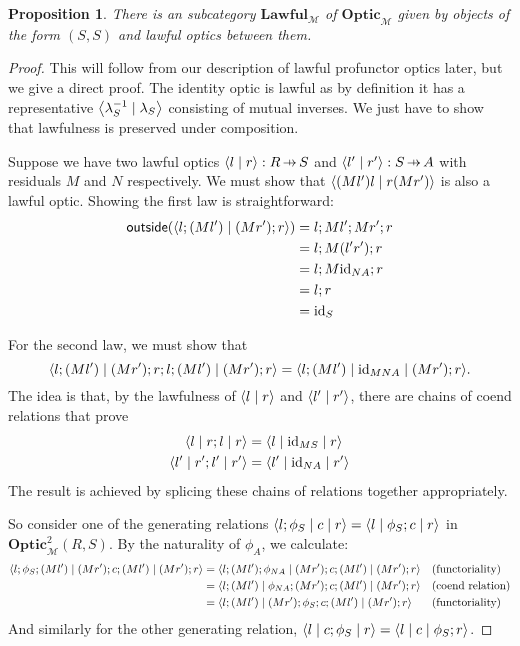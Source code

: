 \documentclass[11pt,letterpaper]{article}
\theoremstyle{plain}
\newtheorem{proposition}[theorem]{Proposition}
\theoremstyle{definition}
\newcommand{\M}{\mathscr{M}}
\newcommand{\Optic}{\mathbf{Optic}}
\newcommand{\Twoptic}{\mathbf{Optic}^2}
\newcommand{\Lawful}{\mathbf{Lawful}}
\newcommand{\id}{\mathrm{id}}
\newcommand{\rep}[2]{{\ensuremath \left\langle #1 \mid #2 \right\rangle}}
\newcommand{\repthree}[3]{{\ensuremath \langle #1 \mid #2 \mid #3 \rangle}}
\newcommand{\outside}{\mathsf{outside}}
\newcommand{\hto}{\ensuremath{\,\mathaccent\shortmid\rightarrow\,}}
\begin{document}
\begin{proposition}\label{prop:lawful-category}
  There is an subcategory $\Lawful_\M$ of $\Optic_\M$ given by objects of the form $(S, S)$ and lawful optics between them.
\end{proposition}
\begin{proof}
  This will follow from our description of lawful profunctor optics later, but we give a direct proof. The identity optic is lawful as by definition it has a representative $\rep{\lambda_S^{-1}}{\lambda_S}$ consisting of mutual inverses. We just have to show that lawfulness is preserved under composition.

  Suppose we have two lawful optics $\rep{l}{r} : R \hto S$ and $\rep{l'}{r'} : S \hto A$ with residuals $M$ and $N$ respectively. We must show that $\rep{(Ml')l}{r (Mr')}$ is also a lawful optic. Showing the first law is straightforward:
  \begin{align*}
    \outside(\rep{l; (Ml')}{(Mr') ; r})
    &= l ; Ml' ; Mr' ; r \\
    &= l ; M(l'r') ; r \\
    &= l ; M\id_{NA} ; r \\
    &= l ; r \\
    &= \id_S
  \end{align*}

  For the second law, we must show that
  \[ \repthree{ l;(Ml')}{(Mr'); r;l;(Ml')}{(Mr') ; r} = \repthree{l;(Ml')}{\id_{MNA}}{(Mr') ; r}. \]
  The idea is that, by the lawfulness of $\rep{l}{r}$ and $\rep{l'}{r'}$, there are chains of coend relations that prove
  \begin{align*}
  \repthree{l}{r;l}{r} &= \repthree{l}{\id_{MS}}{r} \\
  \repthree{l'}{r';l'}{r'} &= \repthree{l'}{\id_{NA}}{r'}
  \end{align*}
  The result is achieved by splicing these chains of relations together appropriately.

  So consider one of the generating relations $\repthree{l;\phi_S}{c}{r} = \repthree{l}{\phi_S ; c}{r}$ in $\Twoptic_\M(R, S)$. By the naturality of $\phi_A$, we calculate:
  \begin{align*}
    \repthree{l;\phi_S;(Ml')}{(Mr'); c ;(Ml')}{(Mr') ; r}
    &= \repthree{l;(Ml');\phi_{NA}}{(Mr'); c ;(Ml')}{(Mr') ; r} && \text{(functoriality)} \\
    &= \repthree{l;(Ml')}{\phi_{NA};(Mr'); c ;(Ml')}{(Mr') ; r} && \text{(coend relation)} \\
    &= \repthree{l;(Ml')}{(Mr');\phi_{S}; c ;(Ml')}{(Mr') ; r} && \text{(functoriality)}
  \end{align*}
  And similarly for the other generating relation, $\repthree{l}{c;\phi_S}{r} = \repthree{l}{c}{\phi_S; r}$.
  

\end{proof}
\end{document}
